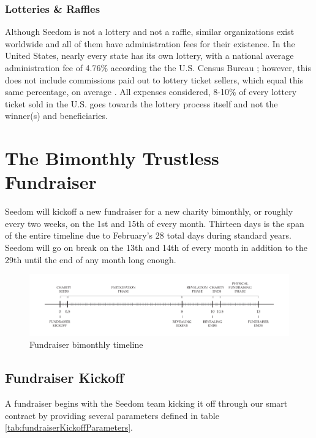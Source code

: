 \documentclass[11pt]{article}
\begin{document}
\subsubsection{Lotteries \& Raffles}

Although Seedom is not a lottery and not a raffle, similar organizations exist worldwide and all of them have administration fees for their existence. In the United States, nearly every state has its own lottery, with a national average administration fee of 4.76\% according the the U.S. Census Bureau \cite{3}; however, this does not include commissions paid out to lottery ticket sellers, which equal this same percentage, on average \cite{4}. All expenses considered, 8-10\% of every lottery ticket sold in the U.S. goes towards the lottery process itself and not the winner(s) and beneficiaries.

\section{The Bimonthly Trustless Fundraiser}

Seedom will kickoff a new fundraiser for a new charity bimonthly, or roughly every two weeks, on the 1st and 15th of every month. Thirteen days is the span of the entire timeline due to February's 28 total days during standard years. Seedom will go on break on the 13th and 14th of every month in addition to the 29th until the end of any month long enough.

\begin{figure}[H]
\begin{center}
\includegraphics[width=1.0\textwidth]{fundraiserBimonthlyTimeline.pdf}
\caption{Fundraiser bimonthly timeline}
\label{figure:fundraiserBimonthlyTimeline}
\end{center}
\end{figure}

\subsection{Fundraiser Kickoff}
A fundraiser begins with the Seedom team kicking it off through our smart contract by providing several parameters defined in table \ref{tab:fundraiserKickoffParameters}.
\end{document}
